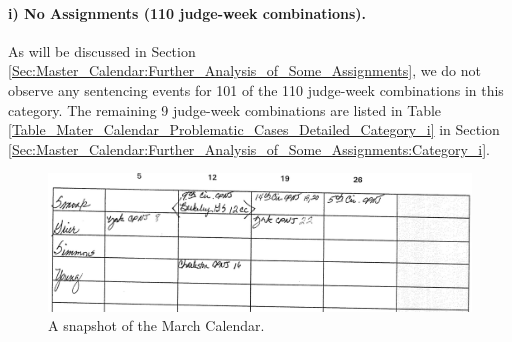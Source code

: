 \documentclass[11pt, oneside]{article}   	%
\theoremstyle{ModifiedStyle}
\begin{document}
\vspace{-3mm}
\paragraph{i) No Assignments (110 judge-week combinations).}
\label{Category_i}
As will be discussed in Section \ref{Sec:Master_Calendar:Further_Analysis_of_Some_Assignments}, we do not observe any sentencing events for 101 of the 110 judge-week combinations in this category. The remaining 9 judge-week combinations are listed in Table \ref{Table_Mater_Calendar_Problematic_Cases_Detailed_Category_i} in Section \ref{Sec:Master_Calendar:Further_Analysis_of_Some_Assignments:Category_i}.

\begin{figure}[H]
	\centering
	\vspace{-0mm}
	\includegraphics[scale=0.097]{Figures/Fig2}
	\caption{A snapshot of the March Calendar.}
	\label{Figure_Master_Calendar_1}
\end{figure}

\vspace{-3mm}
\end{document}
